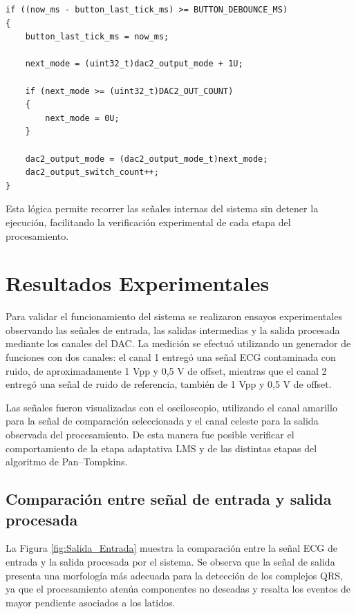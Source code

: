 \documentclass[12pt]{article}
\begin{document}
		\begin{lstlisting}[style=mystyle, caption={Cambio de modo de visualización mediante B1.}]
if ((now_ms - button_last_tick_ms) >= BUTTON_DEBOUNCE_MS)
{
    button_last_tick_ms = now_ms;

    next_mode = (uint32_t)dac2_output_mode + 1U;

    if (next_mode >= (uint32_t)DAC2_OUT_COUNT)
    {
        next_mode = 0U;
    }

    dac2_output_mode = (dac2_output_mode_t)next_mode;
    dac2_output_switch_count++;
}
		\end{lstlisting}

		Esta lógica permite recorrer las señales internas del sistema sin detener la ejecución, facilitando la verificación experimental de cada etapa del procesamiento.
	\section{Resultados Experimentales}

		Para validar el funcionamiento del sistema se realizaron ensayos experimentales observando las señales de entrada, las salidas intermedias y la salida procesada mediante los canales del DAC. La medición se efectuó utilizando un generador de funciones con dos canales: el canal 1 entregó una señal ECG contaminada con ruido, de aproximadamente 1 Vpp y 0,5 V de offset, mientras que el canal 2 entregó una señal de ruido de referencia, también de 1 Vpp y 0,5 V de offset.

		Las señales fueron visualizadas con el osciloscopio, utilizando el canal amarillo para la señal de comparación seleccionada y el canal celeste para la salida observada del procesamiento. De esta manera fue posible verificar el comportamiento de la etapa adaptativa LMS y de las distintas etapas del algoritmo de Pan--Tompkins.

		\subsection{Comparación entre señal de entrada y salida procesada}

		La Figura \ref{fig:Salida_Entrada} muestra la comparación entre la señal ECG de entrada y la salida procesada por el sistema. Se observa que la señal de salida presenta una morfología más adecuada para la detección de los complejos QRS, ya que el procesamiento atenúa componentes no deseadas y resalta los eventos de mayor pendiente asociados a los latidos.
\end{document}

